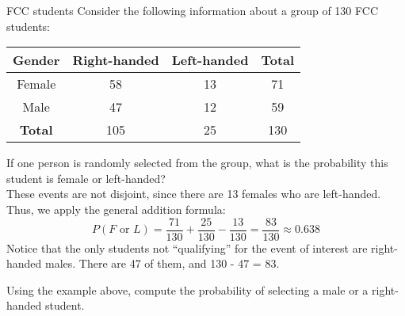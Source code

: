 \begin{example}[https://www.youtube.com/watch?v=Z3FKbz7RnSs]{FCC students}
Consider the following information about a group of 130 FCC students:

\begin{center}
\begin{tabular}{|c|c|c|c|}
\hline
Gender & Right-handed & Left-handed & \textbf{Total} \\ \hline 
Female & 58 & 13 & 71\\ \hline
Male & 47 & 12 & 59  \\ \hline
\textbf{Total} & 105 & 25 & 130 \\ \hline 
\end{tabular}
\end{center}

If one person is randomly selected from the group, what is the probability this student is female or left-handed? \\

 These events are not disjoint, since there are 13 females who are left-handed. Thus, we apply the general addition formula:
\[  P(F \mbox{ or } L) = \frac{71}{130} + \frac{25}{130} - \frac{13}{130} = \frac{83}{130} \approx 0.638 \]
Notice that the only students not ``qualifying'' for the event of interest are right-handed males. There are 47 of them, and 130 - 47 = 83. 
\end{example}

\begin{try}
Using the example above, compute the probability of selecting a male or a right-handed student. 
\end{try}

